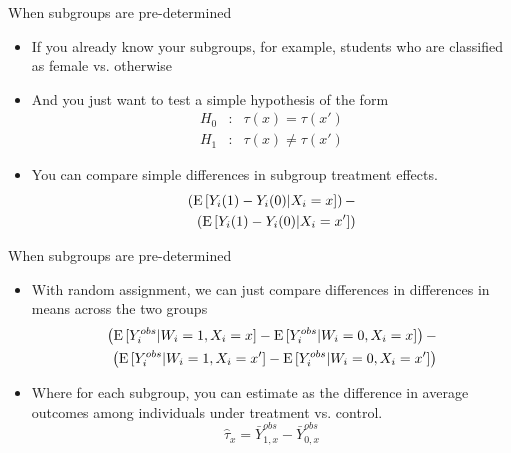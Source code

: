 \documentclass[xcolor={dvipsnames},handout]{beamer}
\begin{document}

\begin{frame}{When subgroups are pre-determined}

\begin{itemize}
\item If you already know your subgroups, for example, students who are classified as female vs. otherwise
\item And you just want to test a simple hypothesis of the form
\begin{align*}
H_0 & : &  \tau(x) = \tau(x')\\
H_1 & : &  \tau(x) \neq \tau(x')
\end{align*}

\item You can compare simple differences in subgroup treatment effects.
\begin{align*}
\left( {\textrm E}\,[Y_i(1) - Y_i(0) | X_i = x]\right)- \\
\left( {\textrm E}\,[Y_i(1) - Y_i(0) | X_i = x']\right)
\end{align*}
\end{itemize}

\end{frame}



\begin{frame}{When subgroups are pre-determined}



\begin{itemize}
\item With random assignment, we can just compare differences in differences in means across the two groups
\begin{align*}
\left( {\textrm E}\,[Y_i^{obs} | W_i = 1, X_i = x] - {\textrm E}\,[Y_i^{obs} | W_i = 0, X_i = x]\right)- \\
\left( {\textrm E}\,[Y_i^{obs} | W_i = 1, X_i = x'] - {\textrm E}\,[Y_i^{obs} | W_i = 0, X_i = x']\right)
\end{align*}

\item Where for each subgroup, you can estimate as the difference in average outcomes among individuals under treatment vs. control.
\[
\hat \tau_x  = \bar Y^{obs}_{1, x} - \bar Y^{obs}_{0, x}
\]

\end{itemize}

\end{frame}
\end{document}
